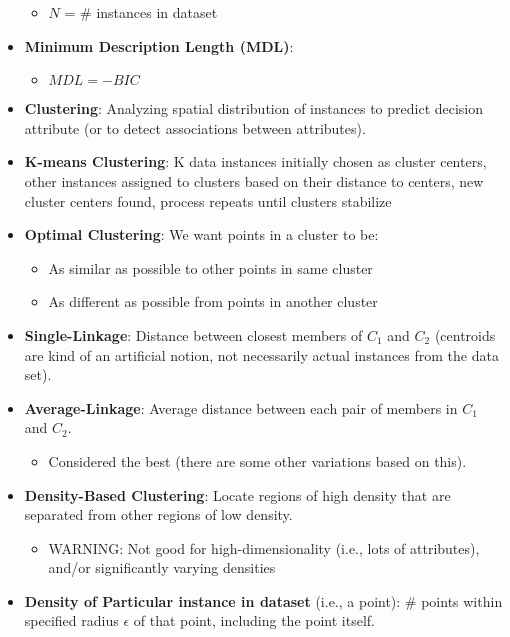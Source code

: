 \documentclass{article}
\begin{document}
\begin{itemize}
\begin{itemize}
			\item $N$ = \# instances in dataset
		\end{itemize}
	\item {\bf Minimum Description Length (MDL)}:
		\begin{itemize}
			\item $MDL = -BIC$
		\end{itemize}
	\item {\bf Clustering}: Analyzing spatial distribution of instances to predict decision attribute (or to detect associations between attributes).
	\item {\bf K-means Clustering}: K data instances initially chosen as cluster centers, other instances assigned to clusters based on their distance to centers, new cluster centers found, process repeats until clusters stabilize
	\item {\bf Optimal Clustering}: We want points in a cluster to be:
		\begin{itemize}
			\item As similar as possible to other points in same cluster
			\item As different as possible from points in another cluster
		\end{itemize}
	\item {\bf Single-Linkage}: Distance between closest members of $C_1$ and $C_2$ (centroids are kind of an artificial notion, not necessarily actual instances from the data set).
	\item {\bf Average-Linkage}: Average distance between each pair of members in $C_1$ and $C_2$. 
		\begin{itemize}
			\item Considered the best (there are some other variations based on this).
		\end{itemize}
	\item {\bf Density-Based Clustering}: Locate regions of high density that are separated from other regions of low density.
		\begin{itemize}
			\item WARNING: Not good for high-dimensionality (i.e., lots of attributes), and/or significantly varying densities
		\end{itemize}
	\item {\bf Density of Particular instance in dataset} (i.e., a point): \# points within specified radius  $\epsilon$ of that point, including the point itself.
	
\end{itemize}
\end{document}
